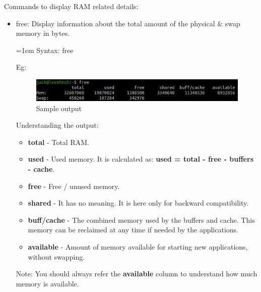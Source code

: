 \setlength{\columnsep}{3pt}
\begin{flushleft}
Commands to display RAM related details:
\begin{itemize}
	
	\item free: Display information about the total amount of the physical \& swap memory in bytes.
	
	\begin{tcolorbox}[breakable,notitle,boxrule=-0pt,colback=pink,colframe=pink]
		\color{black}
		\font=1em
		Syntax: free
		\font=4pt
	\end{tcolorbox}
	Eg:
	\begin{figure}[h!]
		\centering
		\includegraphics[scale=.3]{content/chapter12/images/free.png}
		\caption{Sample output}
		\label{fig:cpu1}
	\end{figure}
	
	Understanding the output:
	\begin{itemize}
		\item \textbf{total} - Total RAM.
		\item \textbf{used} - Used memory. It is calculated as: \textbf{used = total - free - buffers - cache}.
		\item \textbf{free} - Free / unused memory.
		\item \textbf{shared} - It has no meaning. It is here only for backward compatibility.
		\item \textbf{buff/cache} - The combined memory used by the buffers and cache. This memory can be reclaimed at any time if needed by the applications.
		\item \textbf{available} - Amount of memory available for starting new applications, without swapping.
	\end{itemize}
	\bigskip
	\begin{tcolorbox}[breakable,notitle,boxrule=-0pt,colback=yellow,colframe=yellow]
		\color{black}
		Note: You should always refer the \textbf{available} column to understand how much memory is available.
	\end{tcolorbox}
	\newpage
	

\end{itemize}
\end{flushleft}

